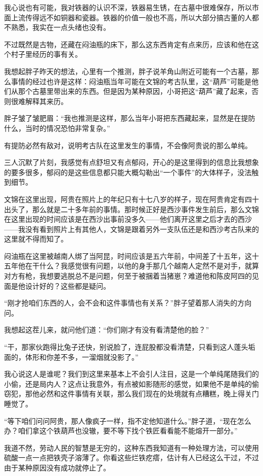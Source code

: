 我心说也有可能，我对铁器的认识不深，铁器易生锈，在古墓中很难保存，所以市面上流传得远不如铜器和瓷器。铁器的价值一般也不高，所以大部分搞古董的人都不熟悉，我实在一点头绪也没有。

不过既然是古物，还藏在闷油瓶的床下，那么这东西肯定有点来历，应该和他在这个村子里经历的事有关。

我想起胖子昨天的想法，心里有一个推测，胖子说羊角山附近可能有一个古墓，那么事情的经过也许是这样：闷油瓶当年可能在文锦的考古队里，这“葫芦”可能是他们从那个古墓里带出来的东西。但是因为某种原因，小哥把这“葫芦”藏了起来，否则很难解释其来历。

胖子皱了皱肥眉：“我也推测是这样，那么当年小哥把东西藏起来，显然是在提防什么，当时的情况恐怕非常复杂。”

有提防必然有敌对，说明考古队在这里发生的事情，不会像阿贵说的那么单纯。

三人沉默了片刻，我感觉有点舒坦又有点郁闷，开心的是这里得到的信息比我想象的要多很多，郁闷的是这些信息都只能大概勾勒出“一个事件”的大体样子，没法触到细节。

文锦在这里出现，阿贵在照片上的年纪只有十七八岁的样子，现在阿贵肯定有四十出头了，那么就是二十多年前的事情。那时候正好是西沙事件发生前后，那么文锦在这里出现的时间应该是在西沙出事前没多久——他们离开这里之后才去的西沙——我没有看到照片上有其他人，文锦是跟着另外一支队伍还是和西沙考古队来的这里就不得而知了。

闷油瓶在这里被越南人绑了当阿昆，时间应该是五六年前，中间差了十五年，这十五年他在干什么？我感觉很有问题，以他的身手那几个越南人定然不是对手，就算对方有枪，我想要逃脱总不是问题，何至于被捆着当猪崽？难道他和陈皮阿四的见面是他设计好的？这些都是疑问。

“刚才抢咱们东西的人，会不会和这件事情也有关系？”胖子望着那人消失的方向问。

我想起这茬儿来，就问他们道：“你们刚才有没有看清楚他的脸？”

“干，那家伙跑得比兔子还快，别说脸了，连屁股都没看清楚，只看到这人蓬头垢面的，体形和你差不多，一溜烟就没影了。”

我心说这人是谁呢？我们到这里来基本上不会引人注目，这是一个单纯尾随我们的小偷，还是局内人？这点让我意外，有点被如影随形的感觉，如果他不是单纯的偷窃犯，那他必然和这件事情有关联，那么我们现在的处境就有点糟糕，晚上得关门睡觉了。

“等下咱们问问阿贵，那人像疯子一样，指不定他知道什么。”胖子道，“现在怎么办？咱们拿这个铁葫芦也没辙，要不等下找个铁匠看看能不能熔开一部分。”

我道不然，劳动人民的智慧是无穷的，这种东西我知道有一种处理方法，可以使用硫酸一点一点把铁壳子溶薄了。你看这些烂铁疙瘩，估计有人已经这么干过，不过由于某种原因没有成功就停止了。

